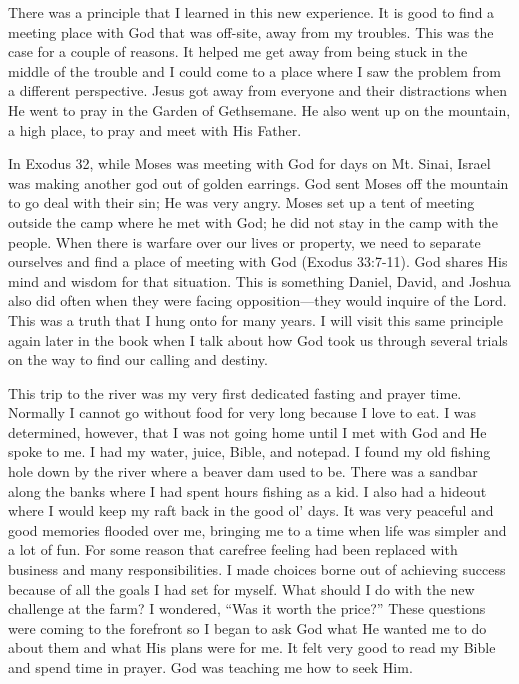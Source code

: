 \documentclass[oneside]{book}
\begin{document}
There was a principle that I learned in this new experience. It is good to find a meeting place with God that was off-site, away from my troubles. This was the case for a couple of reasons. It helped me get away from being stuck in the middle of the trouble and I could come to a place where I saw the problem from a different perspective. Jesus got away from everyone and their distractions when He went to pray in the Garden of Gethsemane. He also went up on the mountain, a high place, to pray and meet with His Father. 

In Exodus 32, while Moses was meeting with God for days on Mt. Sinai, Israel was making another god out of golden earrings. God sent Moses off the mountain to go deal with their sin;  He was very angry. Moses set up a tent of meeting outside the camp where he met with God; he did not stay in the camp with the people. When there is warfare over our lives or property, we need to separate ourselves and find a place of meeting with God (Exodus 33:7-11). God shares His mind and wisdom for that situation. This is something Daniel, David, and Joshua also did often when they were facing opposition—they would inquire of the Lord. This was a truth that I hung onto for many years. I will visit this same principle again later in the book when I talk about how God took us through several trials on the way to find our calling and destiny.

This trip to the river was my very first dedicated fasting and prayer time. Normally I cannot go without food for very long because I love to eat. I was determined, however, that I was not going home until I met with God and He spoke to me. I had my water, juice, Bible, and notepad. I found my old fishing hole down by the river where a beaver dam used to be. There was a sandbar along the banks where I had spent hours fishing as a kid. I also had a hideout where I would keep my raft back in the good ol' days. It was very peaceful and good memories flooded over me, bringing me to a time when life was simpler and a lot of fun. For some reason that carefree feeling had been replaced with business and many responsibilities. I made choices borne out of achieving success because of all the goals I had set for myself. What should I do with the new challenge at the farm? I wondered, “Was it worth the price?” These questions were coming to the forefront so I began to ask God what He wanted me to do about them and what His plans were for me. It felt very good to read my Bible and spend time in prayer. God was teaching me how to seek Him.
\end{document}
